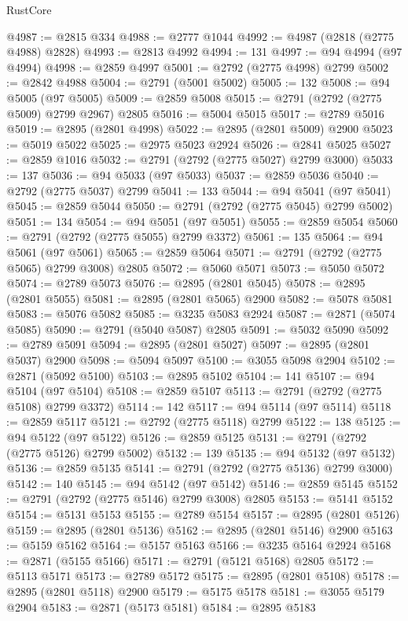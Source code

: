 \begin{lexlean}{RustCore}
\begin{coremodule}
@4987 := @2815 @334
@4988 := @2777 @1044
@4992 := @4987 (@2818 (@2775 @4988) @2828)
@4993 := @2813 @4992
@4994 := 131
@4997 := @94 @4994 (@97 @4994)
@4998 := @2859 @4997
@5001 := @2792 (@2775 @4998) @2799
@5002 := @2842 @4988
@5004 := @2791 (@5001 @5002)
@5005 := 132
@5008 := @94 @5005 (@97 @5005)
@5009 := @2859 @5008
@5015 := @2791 (@2792 (@2775 @5009) @2799 @2967) @2805
@5016 := @5004 @5015
@5017 := @2789 @5016
@5019 := @2895 (@2801 @4998)
@5022 := @2895 (@2801 @5009) @2900
@5023 := @5019 @5022
@5025 := @2975 @5023 @2924
@5026 := @2841 @5025
@5027 := @2859 @1016
@5032 := @2791 (@2792 (@2775 @5027) @2799 @3000)
@5033 := 137
@5036 := @94 @5033 (@97 @5033)
@5037 := @2859 @5036
@5040 := @2792 (@2775 @5037) @2799
@5041 := 133
@5044 := @94 @5041 (@97 @5041)
@5045 := @2859 @5044
@5050 := @2791 (@2792 (@2775 @5045) @2799 @5002)
@5051 := 134
@5054 := @94 @5051 (@97 @5051)
@5055 := @2859 @5054
@5060 := @2791 (@2792 (@2775 @5055) @2799 @3372)
@5061 := 135
@5064 := @94 @5061 (@97 @5061)
@5065 := @2859 @5064
@5071 := @2791 (@2792 (@2775 @5065) @2799 @3008) @2805
@5072 := @5060 @5071
@5073 := @5050 @5072
@5074 := @2789 @5073
@5076 := @2895 (@2801 @5045)
@5078 := @2895 (@2801 @5055)
@5081 := @2895 (@2801 @5065) @2900
@5082 := @5078 @5081
@5083 := @5076 @5082
@5085 := @3235 @5083 @2924
@5087 := @2871 (@5074 @5085)
@5090 := @2791 (@5040 @5087) @2805
@5091 := @5032 @5090
@5092 := @2789 @5091
@5094 := @2895 (@2801 @5027)
@5097 := @2895 (@2801 @5037) @2900
@5098 := @5094 @5097
@5100 := @3055 @5098 @2904
@5102 := @2871 (@5092 @5100)
@5103 := @2895 @5102
@5104 := 141
@5107 := @94 @5104 (@97 @5104)
@5108 := @2859 @5107
@5113 := @2791 (@2792 (@2775 @5108) @2799 @3372)
@5114 := 142
@5117 := @94 @5114 (@97 @5114)
@5118 := @2859 @5117
@5121 := @2792 (@2775 @5118) @2799
@5122 := 138
@5125 := @94 @5122 (@97 @5122)
@5126 := @2859 @5125
@5131 := @2791 (@2792 (@2775 @5126) @2799 @5002)
@5132 := 139
@5135 := @94 @5132 (@97 @5132)
@5136 := @2859 @5135
@5141 := @2791 (@2792 (@2775 @5136) @2799 @3000)
@5142 := 140
@5145 := @94 @5142 (@97 @5142)
@5146 := @2859 @5145
@5152 := @2791 (@2792 (@2775 @5146) @2799 @3008) @2805
@5153 := @5141 @5152
@5154 := @5131 @5153
@5155 := @2789 @5154
@5157 := @2895 (@2801 @5126)
@5159 := @2895 (@2801 @5136)
@5162 := @2895 (@2801 @5146) @2900
@5163 := @5159 @5162
@5164 := @5157 @5163
@5166 := @3235 @5164 @2924
@5168 := @2871 (@5155 @5166)
@5171 := @2791 (@5121 @5168) @2805
@5172 := @5113 @5171
@5173 := @2789 @5172
@5175 := @2895 (@2801 @5108)
@5178 := @2895 (@2801 @5118) @2900
@5179 := @5175 @5178
@5181 := @3055 @5179 @2904
@5183 := @2871 (@5173 @5181)
@5184 := @2895 @5183

\end{coremodule}
\end{lexlean}
